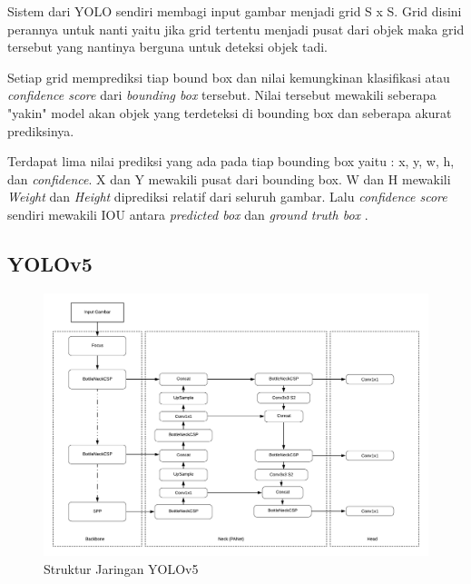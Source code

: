 \par Sistem dari YOLO sendiri membagi input gambar menjadi grid S x S. Grid disini perannya untuk nanti yaitu jika grid tertentu menjadi pusat dari objek maka grid tersebut yang nantinya berguna untuk deteksi objek tadi.

\par Setiap grid memprediksi tiap bound box dan nilai kemungkinan klasifikasi atau \emph{confidence score} dari \emph{bounding box} tersebut. Nilai tersebut mewakili seberapa "yakin" model akan objek yang terdeteksi di bounding box dan seberapa akurat prediksinya. 

\par Terdapat lima nilai prediksi yang ada pada tiap bounding box yaitu : x, y, w, h, dan \emph{confidence}. X dan Y mewakili pusat dari bounding box. W dan H mewakili \emph{Weight} dan \emph{Height} diprediksi relatif dari seluruh gambar. Lalu \emph{confidence score} sendiri mewakili IOU antara \emph{predicted box} dan \emph{ground truth box} \cite{redmon2016you}.

\subsection{YOLOv5}
\label{subsec:yolov5}

\begin{figure}[ht]
    \centering
    \includegraphics[width=1.0\textwidth]{gambar/yolov5 structure.png}
    \caption{Struktur Jaringan YOLOv5}
    \label{fig:yolov5network}  
\end{figure}

